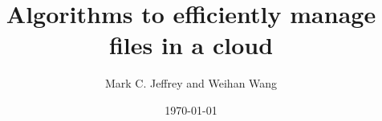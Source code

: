 \documentclass[11pt]{article}
\begin{document}
\newcommand{\commented}[1]{}
\newcommand{\definitionparagraph}[1]{\vspace{0.1in}\noindent {\bf #1} \/\/}

\title{Algorithms to efficiently manage files in a cloud}
\date{\today}
\author{Mark C. Jeffrey and Weihan Wang}

\maketitle













\end{document}
